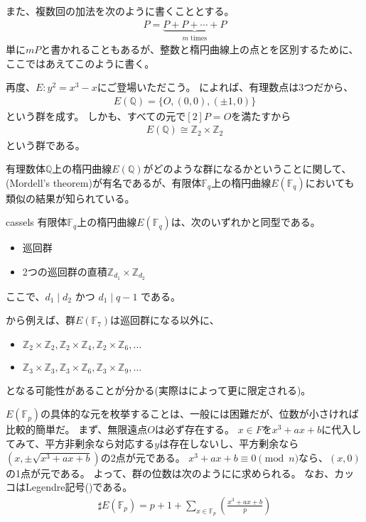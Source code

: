 また、複数回の加法を次のように書くこととする。
\begin{align*}
[m]P = \underbrace{P+P+\cdots+P }_{m\text{ times}}
\end{align*}
単に$mP$と書かれることもあるが、整数と楕円曲線上の点とを区別するために、ここではあえてこのように書く。

再度、$E:y^2=x^3-x$にご登場いただこう。
によれば、有理数点は3つだから、
\begin{align*}
E(\mathbb{Q}) = \{O, (0,0), (\pm1,0)\}
\end{align*}
という群を成す。
しかも、すべての元で$[2]P=O$を満たすから
\begin{align*}
E(\mathbb{Q}) \cong \mathbb{Z}_2 \times \mathbb{Z}_2
\end{align*}
という群である。

有理数体$\mathbb{Q}$上の楕円曲線$E(\mathbb{Q})$がどのような群になるかということに関して、(Mordell's theorem)が有名であるが、有限体$\mathbb{F}_q$上の楕円曲線$E(\mathbb{F}_q)$においても類似の結果が知られている。

\begin{Theo}{\cite{Cassels1966DiophantineEW}}{cassels}
有限体$\mathbb{F}_q$上の楕円曲線$E(\mathbb{F}_q)$は、次のいずれかと同型である。
\begin{itemize}
 \item 巡回群
 \item 2つの巡回群の直積$\mathbb{Z}_{d_1}\times\mathbb{Z}_{d_2}$
\end{itemize}
ここで、$d_1 \mid d_2$ かつ $d_1 \mid q - 1$ である。
\end{Theo}

から例えば、群$E(\mathbb{F}_7)$は巡回群になる以外に、
\begin{itemize}
 \item $\mathbb{Z}_2 \times \mathbb{Z}_2, \mathbb{Z}_2 \times \mathbb{Z}_4, \mathbb{Z}_2 \times \mathbb{Z}_6,\ldots$
 \item $\mathbb{Z}_3 \times \mathbb{Z}_3, \mathbb{Z}_3 \times \mathbb{Z}_6, \mathbb{Z}_3 \times \mathbb{Z}_9,\ldots$
\end{itemize}
となる可能性があることが分かる(実際はによって更に限定される)。

$E(\mathbb{F}_p)$の具体的な元を枚挙することは、一般には困難だが、位数が小さければ比較的簡単だ。
まず、無限遠点$O$は必ず存在する。
$x\in F$を$x^3+ax+b$に代入してみて、平方非剰余なら対応する$y$は存在しないし、平方剰余なら$(x,\pm\sqrt{x^3+ax+b})$の2点が元である。
$x^3+ax+b \equiv 0 \pmod{n}$なら、$(x,0)$の1点が元である。
よって、群の位数は次のようにに求められる。
なお、カッコはLegendre記号()である。
\begin{align*}
\sharp E(\mathbb{F}_p) = p + 1 + \sum_{x \in \mathbb{F}_p} \left( \frac{x^3+ax+b}{p} \right)
\end{align*}

